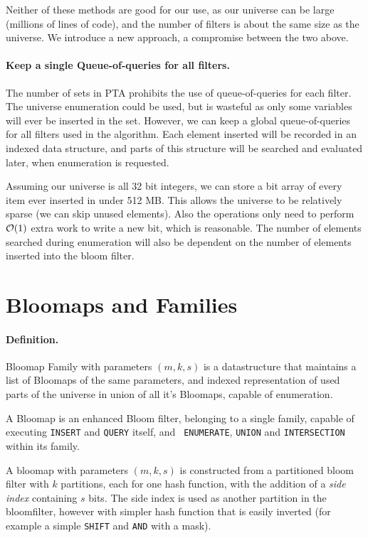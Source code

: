 Neither of these methods are good for our use, as our universe can be large
(millions of lines of code), and the number of filters is about the same size as
the universe. We introduce a new approach, a compromise between the two above.

\paragraph{Keep a single Queue-of-queries for all filters.} The number of sets
in PTA prohibits the use of queue-of-queries for each filter. The universe
enumeration could be used, but is wasteful as only some variables will ever be
inserted in the set. However, we can keep a global queue-of-queries for all
filters used in the algorithm. Each element inserted will be recorded in an
indexed data structure, and parts of this structure will be searched and
evaluated later, when enumeration is requested.

Assuming our universe is all 32 bit integers, we can store a bit array of every
item ever inserted in under 512 MB. This allows the universe to be relatively
sparse (we can skip unused elements). Also the operations only need to perform
$\mathcal{O}(1)$ extra work to write a new bit, which is reasonable. The number of
elements searched during enumeration will also be dependent on the number of
elements inserted into the bloom filter.

\section{Bloomaps and Families}

\paragraph{Definition.} Bloomap Family with parameters $(m, k, s)$ is a
datastructure that maintains a list of Bloomaps of the same parameters, and
indexed representation of used parts of the universe in union of all it's
Bloomaps, capable of enumeration.

A Bloomap is an enhanced Bloom filter, belonging to a single
family, capable of executing {\tt INSERT} and {\tt QUERY} itself, and {\tt
ENUMERATE}, {\tt UNION} and {\tt INTERSECTION} within its family.

A bloomap with parameters $(m, k, s)$ is constructed from a partitioned bloom
filter with $k$ partitions, each for one hash function, with the addition of a
{\it side index} containing $s$ bits. The side index is used as another
partition in the bloomfilter, however with simpler hash function that is easily
inverted (for example a simple {\tt SHIFT} and {\tt AND} with a mask).

